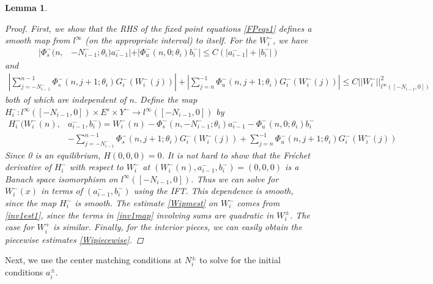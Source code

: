 \documentclass[12pt]{article}
\newtheorem{lemma}{Lemma}
\begin{document}
\begin{lemma}
\begin{proof}
First, we show that the RHS of the fixed point equations \eqref{FPeqs1} defines a smooth map from $l^\infty$ (on the appropriate interval) to itself. For the $W_i^-$, we have
\begin{align}\label{inv1est1}
|\Phi_s^-(n, &-N_{i-1}^-; \theta_i) a_{i-1}^-| + |\Phi_u^-(n, 0; \theta_i) b_i^-| \leq C ( |a_{i-1}^-| + |b_i^-|) 
\end{align}
and
\begin{align*}
\left| \sum_{j = -N_{i-1}^-}^{n-1} \Phi_s^-(n, j+1; \theta_i) G_i^-(W_i^-(j))\right| + \left|\sum_{j = n}^{-1} \Phi_u^-(n, j+1; \theta_i) G_i^-(W_i^-(j))\right| 
\leq C ||W_i^-||_{l^\infty([-N_{i-1}, 0])}^2 
\end{align*}
both of which are independent of $n$. Define the map $H_i^-: l^\infty([-N_{i-1}, 0]) \times E^s \times Y^- \rightarrow l^\infty([-N_{i-1}, 0])$ by
\begin{align}\label{inv1map}
H_i^-(W_i^-(n), &a_{i-1}^-, b_i^-) = W_i^-(n) - \Phi_s^-(n, -N_{i-1}^-; \theta_i) a_{i-1}^- - \Phi_u^-(n, 0; \theta_i) b_i^-  \\
&- \sum_{j = -N_{i-1}^-}^{n-1} \Phi_s^-(n, j+1; \theta_i) G_i^-(W_i^-(j)) + \sum_{j = n}^{-1} \Phi_u^-(n, j+1; \theta_i) G_i^-(W_i^-(j)) \nonumber
\end{align}
Since 0 is an equilibrium, $H(0, 0, 0) = 0$. It is not hard to show that the Fr\'echet derivative of $H_i^-$ with respect to $W_i^-$ at $(W_i^-(n), a_{i-1}^-, b_i^-) = (0, 0, 0)$ is a Banach space isomorphism on $l^\infty([-N_{i-1}, 0])$. Thus we can solve for $W_i^-(x)$ in terms of $(a_{i-1}^-, b_i^-)$ using the IFT. This dependence is smooth, since the map $H_i^-$ is smooth. The estimate \eqref{Wipmest} on $W_i^-$ comes from \eqref{inv1est1}, since the terms in \eqref{inv1map} involving sums are quadratic in $W_i^\pm$. The case for $W_i^+$ is similar. Finally, for the interior pieces, we can easily obtain the piecewise estimates \eqref{Wipiecewise}.
\end{proof}
\end{lemma}

Next, we use the center matching conditions at $N_i^\pm$ to solve for the initial conditions $a_i^\pm$.
\end{document}
